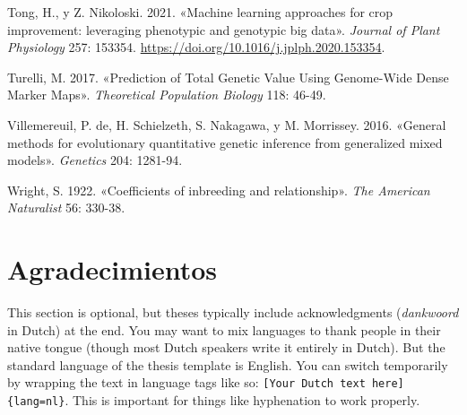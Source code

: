 \documentclass[11pt,spanish,a4paper,oneside,]{book} %
\newcommand{\textdutch}[2][]{\foreignlanguage{dutch}{#2}}
\begin{document}
\leavevmode\hypertarget{ref-cite:7}{}%
Tong, H., y Z. Nikoloski. 2021. «Machine learning approaches for crop improvement: leveraging phenotypic and genotypic big data». \emph{Journal of Plant Physiology} 257: 153354. \url{https://doi.org/10.1016/j.jplph.2020.153354}.

\leavevmode\hypertarget{ref-cite:9}{}%
Turelli, M. 2017. «Prediction of Total Genetic Value Using Genome-Wide Dense Marker Maps». \emph{Theoretical Population Biology} 118: 46-49.

\leavevmode\hypertarget{ref-cite:4}{}%
Villemereuil, P. de, H. Schielzeth, S. Nakagawa, y M. Morrissey. 2016. «General methods for evolutionary quantitative genetic inference from generalized mixed models». \emph{Genetics} 204: 1281-94.

\leavevmode\hypertarget{ref-cite:12}{}%
Wright, S. 1922. «Coefficients of inbreeding and relationship». \emph{The American Naturalist} 56: 330-38.

\endgroup

\hypertarget{agradecimientos}{%
\chapter*{Agradecimientos}\label{agradecimientos}}


This section is optional, but theses typically include acknowledgments (\textdutch{\emph{dankwoord}} in Dutch) at the end. You may want to mix languages to thank people in their native tongue (though most Dutch speakers write it entirely in Dutch). But the standard language of the thesis template is English. You can switch temporarily by wrapping the text in language tags like so: \texttt{{[}Your\ Dutch\ text\ here{]}\{lang=nl\}}. This is important for things like hyphenation to work properly.

\backmatter
\end{document}
